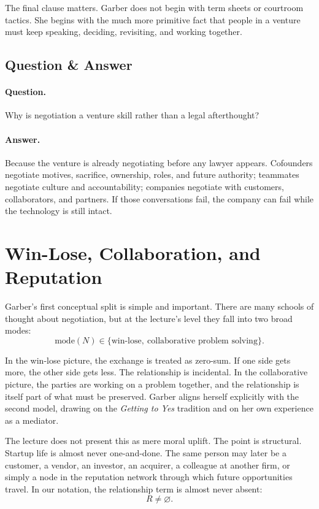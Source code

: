 The final clause matters. Garber does not begin with term sheets or courtroom tactics. She begins with the much more primitive fact that people in a venture must keep speaking, deciding, revisiting, and working together.

\subsection{Question \& Answer}

\paragraph{Question.} Why is negotiation a venture skill rather than a legal afterthought?

\paragraph{Answer.} Because the venture is already negotiating before any lawyer appears. Cofounders negotiate motives, sacrifice, ownership, roles, and future authority; teammates negotiate culture and accountability; companies negotiate with customers, collaborators, and partners. If those conversations fail, the company can fail while the technology is still intact.

\section{Win-Lose, Collaboration, and Reputation}

Garber's first conceptual split is simple and important. There are many schools of thought about negotiation, but at the lecture's level they fall into two broad modes:
\begin{equation}
\mathrm{mode}(N) \in \{\text{win-lose},\ \text{collaborative problem solving}\}.
\end{equation}

In the win-lose picture, the exchange is treated as zero-sum. If one side gets more, the other side gets less. The relationship is incidental. In the collaborative picture, the parties are working on a problem together, and the relationship is itself part of what must be preserved. Garber aligns herself explicitly with the second model, drawing on the \emph{Getting to Yes} tradition and on her own experience as a mediator.

The lecture does not present this as mere moral uplift. The point is structural. Startup life is almost never one-and-done. The same person may later be a customer, a vendor, an investor, an acquirer, a colleague at another firm, or simply a node in the reputation network through which future opportunities travel. In our notation, the relationship term is almost never absent:
\begin{equation}
R \neq \varnothing.
\end{equation}


